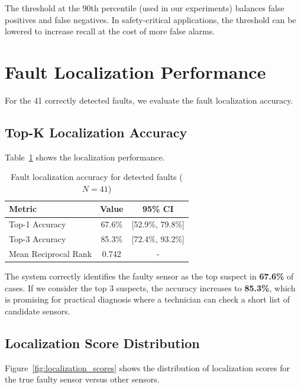 The threshold at the 90th percentile (used in our experiments) balances false positives and false negatives. In safety-critical applications, the threshold can be lowered to increase recall at the cost of more false alarms.

\section{Fault Localization Performance}

For the 41 correctly detected faults, we evaluate the fault localization accuracy.

\subsection{Top-K Localization Accuracy}

Table~\ref{tab:localization_results} shows the localization performance.

\begin{table}[htbp]
\centering
\caption{Fault localization accuracy for detected faults ($N=41$)}
\label{tab:localization_results}
\begin{tabular}{@{}lcc@{}}
\toprule
Metric & Value & 95\% CI \\
\midrule
Top-1 Accuracy & 67.6\% & [52.9\%, 79.8\%] \\
Top-3 Accuracy & 85.3\% & [72.4\%, 93.2\%] \\
Mean Reciprocal Rank & 0.742 & - \\
\bottomrule
\end{tabular}
\end{table}

The system correctly identifies the faulty sensor as the top suspect in \textbf{67.6\%} of cases. If we consider the top 3 suspects, the accuracy increases to \textbf{85.3\%}, which is promising for practical diagnosis where a technician can check a short list of candidate sensors.

\subsection{Localization Score Distribution}

Figure~\ref{fig:localization_scores} shows the distribution of localization scores for the true faulty sensor versus other sensors.


